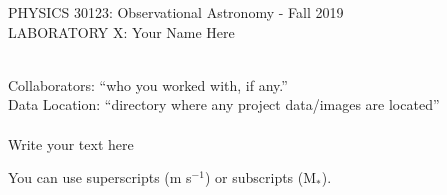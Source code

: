 \documentclass[12pt]{article}
\begin{document}
\def\pos{\medskip\quad}
\def\subpos{\smallskip \qquad}

\begin{center}
{\large
PHYSICS  30123: Observational Astronomy - Fall 2019}\\
{\large LABORATORY X: Your Name Here}\\\vskip0.25in
\end{center}
 \\
Collaborators: ``who you worked with, if any.''\\
Data Location: ``directory where any project data/images are located''\\

\vskip0.1in
 \\

Write your text here



You can use superscripts (m s$^{-1}$) or subscripts (M$_{*}$). 
\end{document}
